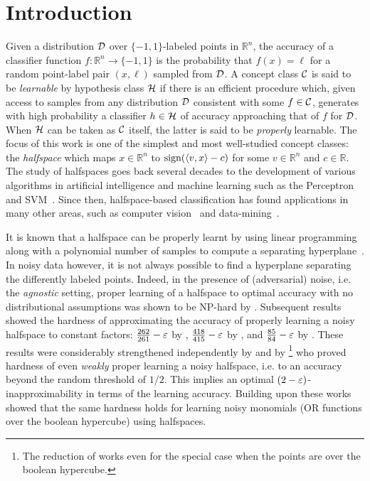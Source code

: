 \section{Introduction}

Given a distribution $\mathcal{D}$ over $\{-1,1\}$-labeled points in
$\mathbb{R}^n$, the accuracy of a classifier function $f : \mathbb{R}^n \to
\{-1,1\}$ is the probability that $f(x) = \ell$ for a random point-label pair $(x, \ell)$
sampled from $\mathcal{D}$. 
A concept class $\mathcal{C}$ is said to be \emph{learnable}
by hypothesis class $\mathcal{H}$ if there is an efficient procedure which,
given access to samples from any distribution $\mathcal{D}$ consistent with some $f \in
\mathcal{C}$, generates with high probability a classifier $h \in \mathcal{H}$ of
accuracy approaching that of $f$ for $\mathcal{D}$. When $\mathcal{H}$ can be
taken as $\mathcal{C}$ itself, the latter is said to be \emph{properly} learnable. The
focus of this work is one
of the simplest and most well-studied concept classes: the \emph{halfspace} which
maps $x \in \mathbb{R}^n$ to $\textnormal{sign}(\langle v, x\rangle - c)$ for
some $v \in \mathbb{R}^n$ and $c \in \mathbb{R}$. The study of
halfspaces goes back several decades to the development of various
algorithms in artificial intelligence and machine learning such as the
Perceptron~\citep{Rosenblatt62,MP69} and  SVM~\citep{CV95}.  Since then,
halfspace-based classification has found applications in many other
areas, such as computer vision~\citep{OJM90} and
data-mining~\citep{RRK04}.





It is known that a halfspace can be properly learnt by using linear
programming along with a polynomial number of samples to compute a
separating hyperplane~\citep{BEHW89}. In noisy data however, it is not
always possible to find a hyperplane separating the differently
labeled points. Indeed, in the presence of (adversarial) noise, 
i.e.  the \emph{agnostic} setting, proper learning of a halfspace to
optimal accuracy with no distributional assumptions  
was shown to be NP-hard by \cite{JP78}.  Subsequent results showed the hardness of
approximating the accuracy of properly learning a noisy halfspace to
constant factors: $\tfrac{262}{261}-\varepsilon$ by \cite{AK98}, $\tfrac{418}{415}-\varepsilon$ by \cite{BDEL00}, and $\tfrac{85}{84}-\varepsilon$ by \cite{BB06}. These results were considerably strengthened 
independently by \cite{FGKP09} and by \cite{GR09}\footnote{The reduction of \cite{GR09}
works even for the special case when the points are over the boolean hypercube.} 
who proved  hardness of even \emph{weakly}
proper learning a noisy halfspace, i.e. 
to an accuracy 
beyond the random threshold of $1/2$. This implies an optimal
$(2-\varepsilon)$-inapproximability in terms of the learning accuracy. 
Building upon these works \cite{FGRW12} showed that the same hardness holds 
for learning noisy monomials (OR functions over the boolean hypercube) using
halfspaces. 





